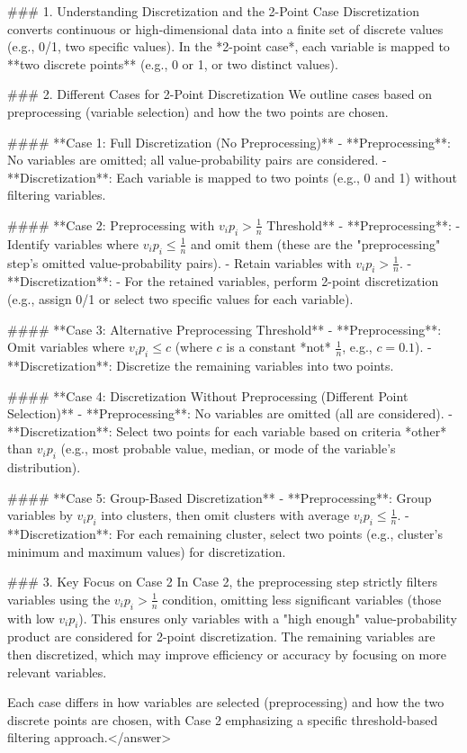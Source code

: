 ### 1. Understanding Discretization and the 2-Point Case  
Discretization converts continuous or high-dimensional data into a finite set of discrete values (e.g., 0/1, two specific values). In the *2-point case*, each variable is mapped to **two discrete points** (e.g., 0 or 1, or two distinct values).  


### 2. Different Cases for 2-Point Discretization  
We outline cases based on preprocessing (variable selection) and how the two points are chosen.  

#### **Case 1: Full Discretization (No Preprocessing)**  
- **Preprocessing**: No variables are omitted; all value-probability pairs are considered.  
- **Discretization**: Each variable is mapped to two points (e.g., 0 and 1) without filtering variables.  

#### **Case 2: Preprocessing with \( v_i p_i > \frac{1}{n} \) Threshold**  
- **Preprocessing**:  
  - Identify variables where \( v_i p_i \leq \frac{1}{n} \) and omit them (these are the "preprocessing" step’s omitted value-probability pairs).  
  - Retain variables with \( v_i p_i > \frac{1}{n} \).  
- **Discretization**:  
  - For the retained variables, perform 2-point discretization (e.g., assign 0/1 or select two specific values for each variable).  

#### **Case 3: Alternative Preprocessing Threshold**  
- **Preprocessing**: Omit variables where \( v_i p_i \leq c \) (where \( c \) is a constant *not* \( \frac{1}{n} \), e.g., \( c = 0.1 \)).  
- **Discretization**: Discretize the remaining variables into two points.  

#### **Case 4: Discretization Without Preprocessing (Different Point Selection)**  
- **Preprocessing**: No variables are omitted (all are considered).  
- **Discretization**: Select two points for each variable based on criteria *other* than \( v_i p_i \) (e.g., most probable value, median, or mode of the variable’s distribution).  

#### **Case 5: Group-Based Discretization**  
- **Preprocessing**: Group variables by \( v_i p_i \) into clusters, then omit clusters with average \( v_i p_i \leq \frac{1}{n} \).  
- **Discretization**: For each remaining cluster, select two points (e.g., cluster’s minimum and maximum values) for discretization.  


### 3. Key Focus on Case 2  
In Case 2, the preprocessing step strictly filters variables using the \( v_i p_i > \frac{1}{n} \) condition, omitting less significant variables (those with low \( v_i p_i \)). This ensures only variables with a "high enough" value-probability product are considered for 2-point discretization. The remaining variables are then discretized, which may improve efficiency or accuracy by focusing on more relevant variables.  


Each case differs in how variables are selected (preprocessing) and how the two discrete points are chosen, with Case 2 emphasizing a specific threshold-based filtering approach.</answer>